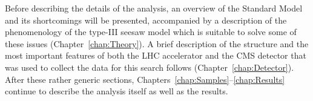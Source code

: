Before describing the details of the analysis, an overview of the Standard Model and its shortcomings will be presented, accompanied by a description of the phenomenology of the type-III seesaw model which is suitable to solve some of these issues (Chapter~\ref{chap:Theory}). A brief description of the structure and the most important features of both the LHC accelerator and the CMS detector that was used to collect the data for this search follows (Chapter~\ref{chap:Detector}). After these rather generic sections, Chapters~\ref{chap:Samples}--\ref{chap:Results} continue to describe the analysis itself as well as the results.
